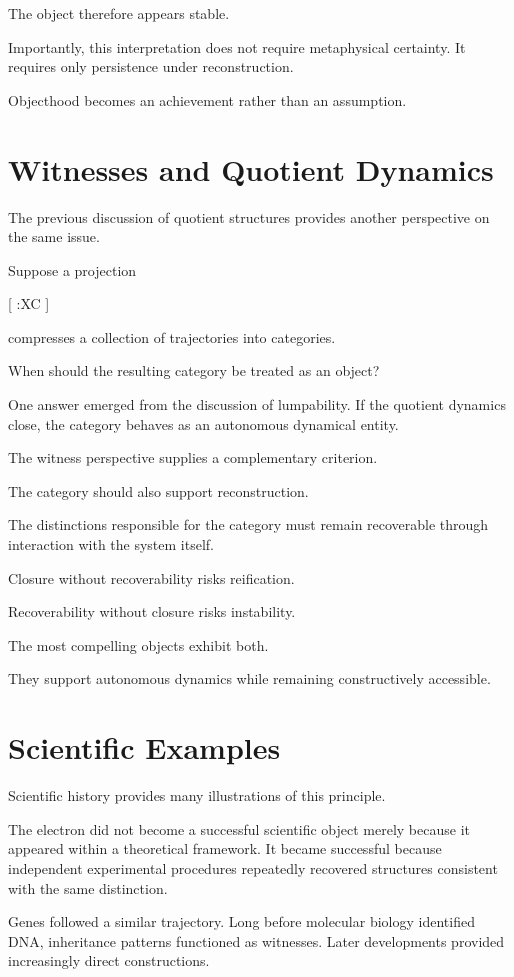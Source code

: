 \documentclass[11pt,oneside,openany]{book}
\begin{document}
The object therefore appears stable.

Importantly, this interpretation does not require metaphysical certainty. It requires only persistence under reconstruction.

Objecthood becomes an achievement rather than an assumption.

\section{Witnesses and Quotient Dynamics}

The previous discussion of quotient structures provides another perspective on the same issue.

Suppose a projection

[
\pi:X\to C
]

compresses a collection of trajectories into categories.

When should the resulting category be treated as an object?

One answer emerged from the discussion of lumpability. If the quotient dynamics close, the category behaves as an autonomous dynamical entity.

The witness perspective supplies a complementary criterion.

The category should also support reconstruction.

The distinctions responsible for the category must remain recoverable through interaction with the system itself.

Closure without recoverability risks reification.

Recoverability without closure risks instability.

The most compelling objects exhibit both.

They support autonomous dynamics while remaining constructively accessible.

\section{Scientific Examples}

Scientific history provides many illustrations of this principle.

The electron did not become a successful scientific object merely because it appeared within a theoretical framework. It became successful because independent experimental procedures repeatedly recovered structures consistent with the same distinction.

Genes followed a similar trajectory. Long before molecular biology identified DNA, inheritance patterns functioned as witnesses. Later developments provided increasingly direct constructions.
\end{document}
